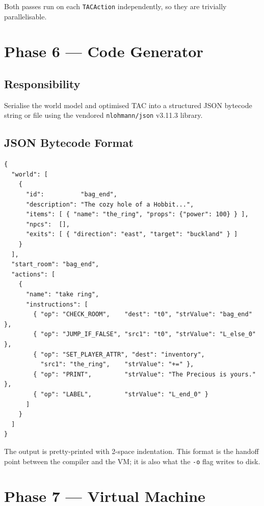 \documentclass[12pt, a4paper]{article}
\begin{document}
Both passes run on each \texttt{TACAction} independently, so they are trivially
parallelisable.

\section{Phase 6 --- Code Generator}

\subsection{Responsibility}
Serialise the world model and optimised TAC into a structured JSON bytecode string
or file using the vendored \texttt{nlohmann/json} v3.11.3 library.

\subsection{JSON Bytecode Format}

\begin{lstlisting}[language={}, basicstyle=\ttfamily\small, frame=single,
    backgroundcolor=\color{code-bg}, caption={JSON bytecode schema}]
{
  "world": [
    {
      "id":          "bag_end",
      "description": "The cozy hole of a Hobbit...",
      "items": [ { "name": "the_ring", "props": {"power": 100} } ],
      "npcs":  [],
      "exits": [ { "direction": "east", "target": "buckland" } ]
    }
  ],
  "start_room": "bag_end",
  "actions": [
    {
      "name": "take ring",
      "instructions": [
        { "op": "CHECK_ROOM",    "dest": "t0", "strValue": "bag_end" },
        { "op": "JUMP_IF_FALSE", "src1": "t0", "strValue": "L_else_0" },
        { "op": "SET_PLAYER_ATTR", "dest": "inventory",
          "src1": "the_ring",    "strValue": "+=" },
        { "op": "PRINT",         "strValue": "The Precious is yours." },
        { "op": "LABEL",         "strValue": "L_end_0" }
      ]
    }
  ]
}
\end{lstlisting}

The output is pretty-printed with 2-space indentation.
This format is the handoff point between the compiler and the VM;
it is also what the \texttt{-o} flag writes to disk.

\section{Phase 7 --- Virtual Machine}
\end{document}
